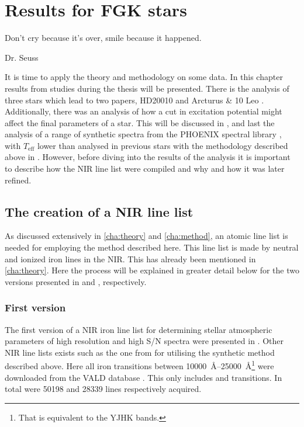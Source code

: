 \chapter{Results for FGK stars}
\label{cha:results}
\epigraph{Don't cry because it's over, smile because it happened.}{Dr. Seuss}

It is time to apply the theory and methodology on some data. In this chapter results from studies
during the thesis will be presented. There is the analysis of three stars which lead to two papers,
HD20010 \citep{Andreasen2016} and Arcturus \& 10 Leo \citep{Andreasen2017b}. Additionally, there was
an analysis of how a cut in excitation potential might affect the final parameters of a star. This
will be discussed in , and last the analysis of a range of synthetic spectra from
the PHOENIX spectral library \citep{Husser2013}, with $T_\mathrm{eff}$ lower than analysed in
previous stars with the methodology described above in . However, before diving
into the results of the analysis it is important to describe how the NIR line list were compiled and
why and how it was later refined.


\section{The creation of a NIR line list}
\label{sec:creation_line_list}

As discussed extensively in \cref{cha:theory} and \cref{cha:method}, an atomic line list is needed
for employing the method described here. This line list is made by neutral and ionized iron lines in
the NIR. This has already been mentioned in \cref{cha:theory}. Here the process will be explained in
greater detail below for the two versions presented in \citet{Andreasen2016} and
\citet{Andreasen2017a}, respectively.


\subsection{First version}

The first version of a NIR iron line list for determining stellar atmospheric parameters of high
resolution and high S/N spectra were presented in \citet{Andreasen2016}. Other NIR line lists exists
such as the one from \citet{Onehag2012,Lindgren2016} for utilising the synthetic method described
above. Here all iron transitions between
\SIrange{10000}{25000}{\angstrom}\footnote{That is equivalent to the YJHK bands.} were downloaded
from the VALD database \citep{VALD1,VALD2}. This only includes  and 
transitions. In total were \num{50198}  and \num{28339}  lines respectively
acquired.

